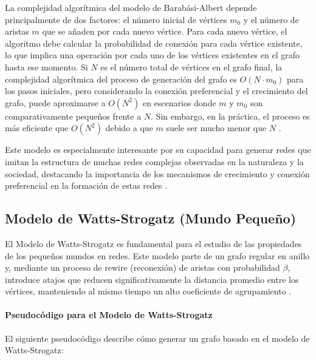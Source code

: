 La complejidad algorítmica del modelo de Barabási-Albert depende principalmente de dos factores: el número inicial de vértices $m_0$ y el número de aristas $m$ que se añaden por cada nuevo vértice. Para cada nuevo vértice, el algoritmo debe calcular la probabilidad de conexión para cada vértice existente, lo que implica una operación por cada uno de los vértices existentes en el grafo hasta ese momento. Si $N$ es el número total de vértices en el grafo final, la complejidad algorítmica del proceso de generación del grafo es $O(N \cdot m_0)$ para los pasos iniciales, pero considerando la conexión preferencial y el crecimiento del grafo, puede aproximarse a $O(N^2)$ en escenarios donde $m$ y $m_0$ son comparativamente pequeños frente a $N$. Sin embargo, en la práctica, el proceso es más eficiente que $O(N^2)$ debido a que $m$ suele ser mucho menor que $N$ .

Este modelo es especialmente interesante por su capacidad para generar redes que imitan la estructura de muchas redes complejas observadas en la naturaleza y la sociedad, destacando la importancia de los mecanismos de crecimiento y conexión preferencial en la formación de estas redes .
\subsection{Modelo de Watts-Strogatz (Mundo Pequeño)}

El Modelo de Watts-Strogatz es fundamental para el estudio de las propiedades de los pequeños mundos en redes. Este modelo parte de un grafo regular en anillo y, mediante un proceso de rewire (reconexión) de aristas con probabilidad $\beta$, introduce atajos que reducen significativamente la distancia promedio entre los vértices, manteniendo al mismo tiempo un alto coeficiente de agrupamiento \citep{Watts1998} .

\paragraph{Pseudocódigo para el Modelo de Watts-Strogatz}

El siguiente pseudocódigo describe cómo generar un grafo basado en el modelo de Watts-Strogatz:

